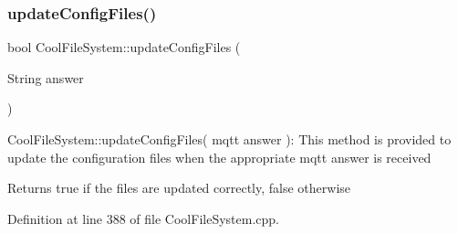 \subsubsection{\texorpdfstring{update\+Config\+Files()}{updateConfigFiles()}}
{\footnotesize\ttfamily bool Cool\+File\+System\+::update\+Config\+Files (\begin{DoxyParamCaption}\item[{String}]{answer }\end{DoxyParamCaption})}

Cool\+File\+System\+::update\+Config\+Files( mqtt answer )\+: This method is provided to update the configuration files when the appropriate mqtt answer is received

\begin{DoxyReturn}{Returns}
true if the files are updated correctly, false otherwise 
\end{DoxyReturn}


Definition at line 388 of file Cool\+File\+System.\+cpp.


